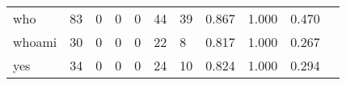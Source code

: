 \begin{longtable}{lp{1.2cm}p{1.2cm}p{1.2cm}p{1.2cm}p{1.2cm}p{1.2cm}p{1.2cm}p{1.2cm}p{1.2cm}p{1.2cm}}
who       &                                    83 &                                                  0 &                                                  0 &                                                  0 &                                                 44 &                                                 39 &                                         0.867 &                                              1.000 &                                              0.470 \\
whoami    &                                    30 &                                                  0 &                                                  0 &                                                  0 &                                                 22 &                                                  8 &                                         0.817 &                                              1.000 &                                              0.267 \\
yes       &                                    34 &                                                  0 &                                                  0 &                                                  0 &                                                 24 &                                                 10 &                                         0.824 &                                              1.000 &                                              0.294 \\
\end{longtable}
